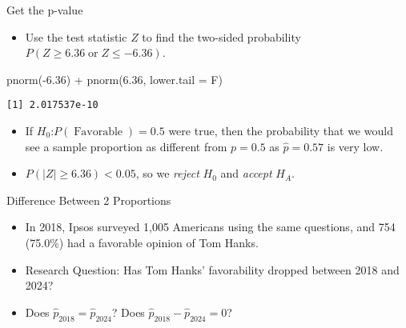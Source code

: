 \documentclass[
  ignorenonframetext,
]{beamer}
\newenvironment{Shaded}{\begin{snugshade}}{\end{snugshade}}
\newcommand{\AttributeTok}[1]{\textcolor[rgb]{0.40,0.45,0.13}{#1}}
\newcommand{\FloatTok}[1]{\textcolor[rgb]{0.68,0.00,0.00}{#1}}
\newcommand{\FunctionTok}[1]{\textcolor[rgb]{0.28,0.35,0.67}{#1}}
\newcommand{\NormalTok}[1]{\textcolor[rgb]{0.00,0.23,0.31}{#1}}
\newcommand{\SpecialCharTok}[1]{\textcolor[rgb]{0.37,0.37,0.37}{#1}}
\providecommand{\tightlist}{%
  \setlength{\itemsep}{0pt}\setlength{\parskip}{0pt}}\usepackage{longtable,booktabs,array}
\begin{document}
\begin{frame}[fragile]{Get the p-value}
\label{get-the-p-value}
\begin{itemize}
\tightlist
\item
  Use the test statistic \(Z\) to find the two-sided probability
  \(P(Z \ge 6.36 \operatorname{or} Z \le -6.36)\).
\end{itemize}

\begin{Shaded}
\begin{Highlighting}[]
\FunctionTok{pnorm}\NormalTok{(}\SpecialCharTok{{-}}\FloatTok{6.36}\NormalTok{) }\SpecialCharTok{+} \FunctionTok{pnorm}\NormalTok{(}\FloatTok{6.36}\NormalTok{, }\AttributeTok{lower.tail =}\NormalTok{ F)}
\end{Highlighting}
\end{Shaded}

\begin{verbatim}
[1] 2.017537e-10
\end{verbatim}

\pause

\begin{itemize}
\tightlist
\item
  If \(H_0\):\(P(\operatorname{Favorable}) = 0.5\) were true, then the
  probability that we would see a sample proportion as different from
  \(p=0.5\) as \(\hat{p}=0.57\) is very low.
\end{itemize}

\pause

\begin{itemize}
\tightlist
\item
  \(P(\lvert Z \rvert \ge 6.36) < 0.05\), so we \emph{reject} \(H_0\)
  and \emph{accept} \(H_A\).
\end{itemize}
\end{frame}

\begin{frame}{Difference Between 2 Proportions}
\label{difference-between-2-proportions}
\begin{itemize}
\tightlist
\item
  In 2018, Ipsos surveyed 1,005 Americans using the same questions, and
  754 (75.0\%) had a favorable opinion of Tom Hanks.
\end{itemize}

\pause

\begin{itemize}
\tightlist
\item
  Research Question: Has Tom Hanks' favorability dropped between 2018
  and 2024?
\end{itemize}

\pause

\begin{itemize}
\tightlist
\item
  Does \(\hat{p}_{2018}=\hat{p}_{2024}\)? Does
  \(\hat{p}_{2018}-\hat{p}_{2024}=0\)?
\end{itemize}
\end{frame}
\end{document}
